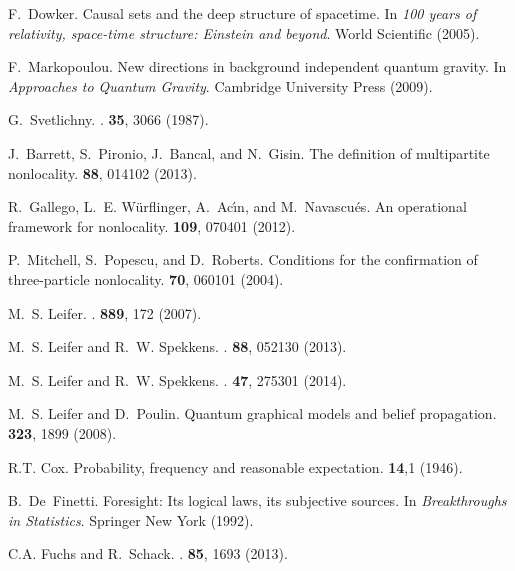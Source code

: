 \documentclass[letterpaper,onecolumn,nofootinbib]{revtex4}
\begin{document}
\begin{thebibliography}{10}
F.~Dowker.
\newblock Causal sets and the deep structure of spacetime.
\newblock In {\em {100 years of relativity, space-time
  structure: Einstein and beyond}}. World Scientific (2005).

F.~Markopoulou.
\newblock New directions in background independent quantum gravity.
\newblock In {\em Approaches to Quantum Gravity}. Cambridge University Press
  (2009).

G.~Svetlichny.
.
 \textbf{35}, 3066 (1987).

J.~Barrett, S.~Pironio, J.~Bancal, and N.~Gisin.
\newblock The definition of multipartite nonlocality.
 \textbf{88}, 014102 (2013).

R.~Gallego, L.~E. W{\"u}rflinger, A.~Ac{\'\i}n, and M.~Navascu{\'e}s.
\newblock An operational framework for nonlocality.
 \textbf{109}, 070401 (2012).

P.~Mitchell, S.~Popescu, and D.~Roberts.
\newblock Conditions for the confirmation of three-particle nonlocality.
 \textbf{70}, 060101 (2004).

M.~S. Leifer.
.
 \textbf{889}, 172 (2007).

M.~S. Leifer and R.~W. Spekkens.
.
 \textbf{88}, 052130 (2013).

M.~S. Leifer and R.~W. Spekkens.
.
 \textbf{47}, 275301 (2014).

M.~S. Leifer and D.~Poulin.
\newblock Quantum graphical models and belief propagation.
 \textbf{323}, 1899 (2008).

R.T. Cox.
\newblock Probability, frequency and reasonable expectation.
 \textbf{14},1 (1946).

B.~De~Finetti.
\newblock Foresight: Its logical laws, its subjective sources.
\newblock In {\em Breakthroughs in Statistics}. Springer New York (1992).

C.A. Fuchs and R.~Schack.
.
 \textbf{85}, 1693 (2013).

\end{thebibliography}
\end{document}
